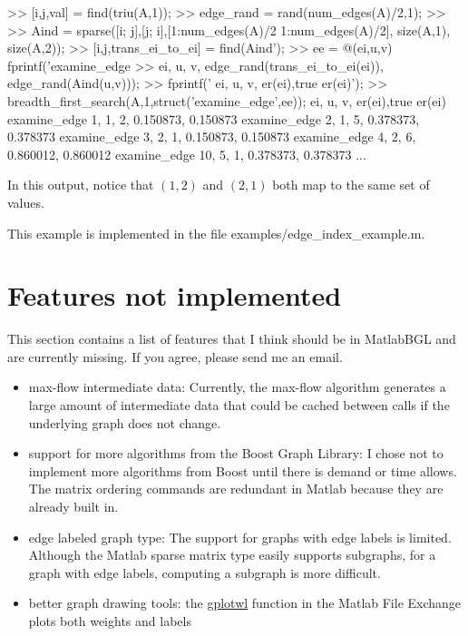 \documentclass[12pt]{article}
\newcommand{\mycmd}[1]{\url{#1}}
\newcommand{\mypath}[1]{{\ttfamily \small #1}}
\begin{document}
\begin{mcode}
>> [i,j,val] = find(triu(A,1));
>> edge_rand = rand(num_edges(A)/2,1);
>> %
>> Aind = sparse([i; j],[j; i],[1:num_edges(A)/2 1:num_edges(A)/2], size(A,1), size(A,2));
>> [i,j,trans_ei_to_ei] = find(Aind');
>> ee = @(ei,u,v) fprintf('examine_edge   %
>>     ei, u, v, edge_rand(trans_ei_to_ei(ei)), edge_rand(Aind(u,v)));
>> fprintf('               ei,   u,   v,     er(ei),true er(ei)\n');
>> breadth_first_search(A,1,struct('examine_edge',ee));
               ei,   u,   v,     er(ei),true er(ei)
examine_edge    1,   1,   2,   0.150873,   0.150873
examine_edge    2,   1,   5,   0.378373,   0.378373
examine_edge    3,   2,   1,   0.150873,   0.150873
examine_edge    4,   2,   6,   0.860012,   0.860012
examine_edge   10,   5,   1,   0.378373,   0.378373
...
\end{mcode}
In this output, notice that $(1,2)$ and $(2,1)$ both map to the same set of values.  







 This example is implemented in the file \mypath{examples/edge\_index\_example.m}.

\section{Features not implemented}

This section contains a list of features that I think should be in MatlabBGL and are currently missing.  If you agree, please send me an email.

\begin{itemize}
\item max-flow intermediate data: Currently, the max-flow algorithm generates a large amount of intermediate data that could be cached between calls if the underlying graph does not change.  
\item support for more algorithms from the Boost Graph Library: I chose not to implement more algorithms from Boost until there is demand or time allows.  The matrix ordering commands are redundant in Matlab because they are already built in.
\item edge labeled graph type: The support for graphs with edge labels is limited.  Although the Matlab sparse matrix type easily supports subgraphs, for a graph with edge labels, computing a subgraph is more difficult.  
\item better graph drawing tools: the \mycmd{gplotwl} function in the Matlab File Exchange plots both weights and labels 
\end{itemize}
\end{document}
